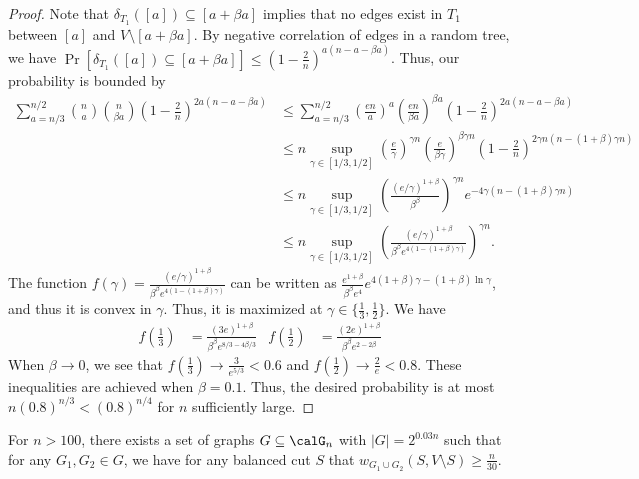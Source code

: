 \begin{proof}
Note that $\delta_{T_1}([a]) \subseteq [a + \beta a]$ implies that no edges exist in $T_1$ between $[a]$ and $V \setminus [a + \beta a]$. By negative correlation of edges in a random tree, we have $\Pr[\delta_{T_1}([a]) \subseteq [a + \beta a]] \leq (1-\frac{2}{n})^{a (n-a-\beta a)}$. Thus, our probability is bounded by 
\begin{align*}
    \sum_{a = n/3}^{n/2} \binom{n}{a} \binom{n}{\beta a} \left(1-\frac{2}{n}\right)^{2a (n-a-\beta a)} &\leq \sum_{a = n/3}^{n/2} \left(\frac{en}{a}\right)^a \left(\frac{en}{\beta a}\right)^{\beta a}\left(1-\frac{2}{n}\right)^{2a (n-a-\beta a)} \\
    &\leq n \sup_{\gamma \in [1/3, 1/2]} \left(\frac{e}{\gamma}\right)^{\gamma n} \left(\frac{e}{\beta \gamma}\right)^{\beta \gamma n}\left(1-\frac{2}{n}\right)^{2\gamma n(n-(1+\beta)\gamma n )} \\
    &\leq n \sup_{\gamma \in [1/3, 1/2]} \left(\frac{(e/\gamma)^{1+\beta}}{\beta^\beta}\right)^{\gamma n} e^{-4\gamma (n-(1+\beta)\gamma n )} \\
    &\leq n \sup_{\gamma \in [1/3, 1/2]} \left(\frac{(e/\gamma)^{1+\beta}}{\beta^\beta e^{4(1-(1+\beta)\gamma)}}\right)^{\gamma n}.
\end{align*}
The function $f(\gamma) = \frac{(e/\gamma)^{1+\beta}}{\beta^\beta e^{4(1-(1+\beta)\gamma)}}$ can be written as $\frac{e^{1+\beta}}{\beta^\beta e^4}e^{4(1+\beta) \gamma - (1+\beta) \ln \gamma}$, and thus it is convex in $\gamma$. Thus, it is maximized at $\gamma \in \{\frac{1}{3}, \frac{1}{2}\}$. We have
\begin{align*}
    f(\frac{1}{3}) &= \frac{(3e)^{1+\beta}}{\beta^\beta e^{8/3 - 4\beta/3}} & f(\frac{1}{2}) &= \frac{(2e)^{1+\beta}}{\beta^\beta e^{2-2\beta}}
\end{align*}
When $\beta \rightarrow 0$, we see that $f(\frac{1}{3}) \rightarrow \frac{3}{e^{5/3}} < 0.6$ and $f(\frac{1}{2}) \rightarrow \frac{2}{e} < 0.8$. These inequalities are achieved when $\beta = 0.1$. Thus, the desired probability is at most $n (0.8)^{n/3} < (0.8)^{n/4}$ for $n$ sufficiently large.


\end{proof}
\begin{lem}\label{chap5-lem:packing}
For $n > 100$, there exists a set of graphs $G \subseteq \calG_n$ with $|G| = 2^{0.03 n}$ such that for any $G_1, G_2 \in G$, we have for any balanced cut $S$ that $w_{G_1 \cup G_2}(S, V \setminus S) \geq \frac{n}{30}$.
\end{lem}
